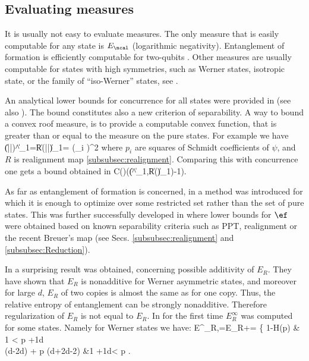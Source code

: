 \documentclass[rmp,12pt,preprint]{revtex4-2}
\begin{document}
\subsection{Evaluating measures}
\label{subsec-evaluating}

It is usually not easy to evaluate measures. The only measure that
is easily computable for any state is $E_\ncal$ (logarithmic
negativity). Entanglement of formation is efficiently computable for
two-qubits \cite{Wootters-conc}. Other measures are usually
computable for states with high symmetries, such as Werner states,
isotropic state, or the family of ``iso-Werner'' states, see
\cite{BDSW1996,TerhalV2000-eof-iso,VollbrechtW2000-ent-sym,
Rains1999,Rains-erratum1999}.

An analytical lower bounds for concurrence for all states were provided
in \cite{MintertKB04-conc} (see also \cite{AudenaertVM2000-concurrence}).
The bound constitutes also a new criterion of separability. A way to bound a convex roof measure, is to provide a computable convex function, that is greater than or equal to the measure on the pure states.
For example  we have
\be
\|(|\psi\>\<\psi|)^\Gamma\|_1=\|R(|\psi\>\<\psi|)\|_1=
\left(\sum_i \right)^2
\ee
where $p_i$ are squares of Schmidt coefficients of $\psi$, and $R$
is realignment map \ref{subsubsec:realignment}. Comparing
this with concurrence one gets  a bound obtained in \cite{AlbeverioLowerBoundPRL1}
\be
C(\rho)\geq {}(\max (\|\rho^\Gamma\|_1,\|R(\rho)\|_1)-1).
\ee

As far as entanglement of formation is concerned, in \cite{TerhalV2000-eof-iso} a method was introduced for which
it is enough to optimize over some  restricted set rather than the set of pure
states. This was further successfully developed in
\cite{FeiX2006-R-EF,AlbeverioLowerBoundPRL,DattaFSC2006-maps-EMs}
where lower bounds for $\ef$ were obtained based on known separability criteria such as PPT, realignment or the recent Breuer's map
(see Secs. \ref{subsubsec:realignment} and  \ref{subsubsec:Reduction}).

In \cite{VollbrechtW2000-ent-sym} a surprising result was obtained, concerning possible
additivity of $E_{R}$. They have shown that $E_R$ is nonadditive
for Werner asymmetric states, and moreover for large $d$, $E_R$ of two copies is almost the same as for one copy. Thus, the
relative entropy of entanglement can be strongly nonadditive.
Therefore regularization of $E_R$ is not equal to $E_R$. In \cite{AEJPVM2001}
for the first time $E_R^\infty$ was computed  for some states.
Namely for Werner states we have:
\be
E^\infty_{R,\scal}=E_{R+\ncal}=
\left\{
1-H(p) & {1} < p +{1\over d}\\
\log \left({d-2\over d}\right) + p \log \left({d+2\over d-2}\right) &{1}
+{1\over d}<
p
\eea
\right.
\ee
\end{document}

